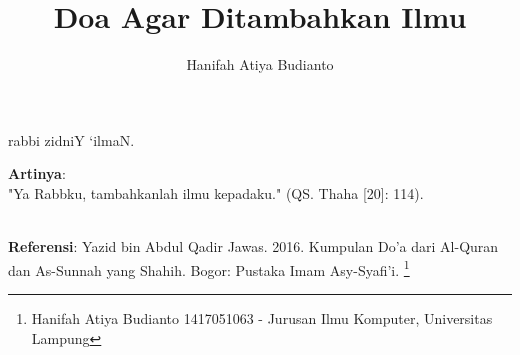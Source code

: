 \documentclass[a4paper,12pt]{article}
\title{\Large Doa Agar Ditambahkan Ilmu}
\author{\calligra Hanifah Atiya Budianto}
\begin{document}
\sffamily
\maketitle 
\fullvocalize 
{}
\begin{arabtext}
\noindent
rabbi zidniY `ilmaN.\\
\end{arabtext}
\noindent
\textbf{Artinya}:\\
\indent
"Ya Rabbku, tambahkanlah ilmu kepadaku." (QS. Thaha [20]: 114).\\\\
\par
\noindent
\textbf{Referensi}: Yazid bin Abdul Qadir Jawas. 2016. Kumpulan Do'a dari
Al-Quran dan As-Sunnah yang Shahih. Bogor: Pustaka Imam Asy-Syafi'i.
\footnote{Hanifah Atiya Budianto 1417051063 - Jurusan Ilmu Komputer,
Universitas Lampung}
\end{document}
